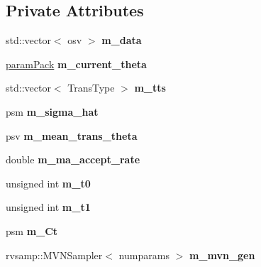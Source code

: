 \subsection*{Private Attributes}
\begin{DoxyCompactItemize}
\item 
\mbox{\label{classada__pmmh__mvn_ab949771e5ae192570033d114d0c2e7ae}} 
std\+::vector$<$ osv $>$ {\bfseries m\+\_\+data}
\item 
\mbox{\label{classada__pmmh__mvn_afa6d44bbd0c45d62f203da32ef0ab8d0}} 
\hyperlink{classparamPack}{param\+Pack} {\bfseries m\+\_\+current\+\_\+theta}
\item 
\mbox{\label{classada__pmmh__mvn_a2202b57d48c4b7bbc07c6fab6ccda8c1}} 
std\+::vector$<$ Trans\+Type $>$ {\bfseries m\+\_\+tts}
\item 
\mbox{\label{classada__pmmh__mvn_ab011919037ee168ea23961959d065d2e}} 
psm {\bfseries m\+\_\+sigma\+\_\+hat}
\item 
\mbox{\label{classada__pmmh__mvn_a5d9247e7aa6bae30dfd2395d16f42758}} 
psv {\bfseries m\+\_\+mean\+\_\+trans\+\_\+theta}
\item 
\mbox{\label{classada__pmmh__mvn_a681eaec171e0f8d52bd3a0a51bd640bf}} 
double {\bfseries m\+\_\+ma\+\_\+accept\+\_\+rate}
\item 
\mbox{\label{classada__pmmh__mvn_a0219599e1feb9b3c22426ecc057f82f5}} 
unsigned int {\bfseries m\+\_\+t0}
\item 
\mbox{\label{classada__pmmh__mvn_aa08cfdc9084342d7ae84ae903854af1f}} 
unsigned int {\bfseries m\+\_\+t1}
\item 
\mbox{\label{classada__pmmh__mvn_a4ada2100837e389cca8381f16c353490}} 
psm {\bfseries m\+\_\+\+Ct}
\item 
\mbox{\label{classada__pmmh__mvn_aca464299316ee6241d495a01dd60b505}} 
rvsamp\+::\+M\+V\+N\+Sampler$<$ numparams $>$ {\bfseries m\+\_\+mvn\+\_\+gen}
\item 

\end{DoxyCompactItemize}
